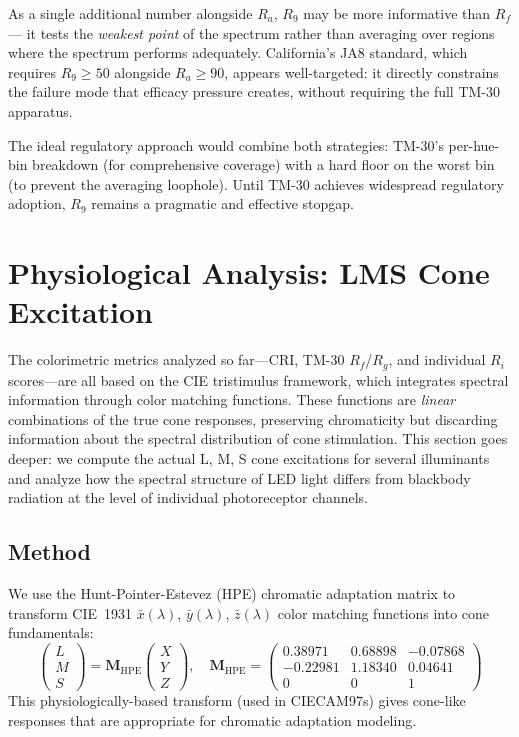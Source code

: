 \documentclass[11pt]{article}
\begin{document}
As a single additional number alongside $R_a$, $R_9$ may be
more informative than $R_f$ --- it tests the \emph{weakest point}
of the spectrum rather than averaging over regions where the spectrum
performs adequately.  California's JA8 standard, which requires
$R_9 \geq 50$ alongside $R_a \geq 90$, appears well-targeted:
it directly constrains the failure mode that efficacy pressure creates,
without requiring the full TM-30 apparatus.

The ideal regulatory approach would combine both strategies:
TM-30's per-hue-bin breakdown (for comprehensive coverage) with a
hard floor on the worst bin (to prevent the averaging loophole).
Until TM-30 achieves widespread regulatory adoption, $R_9$ remains
a pragmatic and effective stopgap.

\section{Physiological Analysis: LMS Cone Excitation}
\label{sec:lms}

The colorimetric metrics analyzed so far---CRI, TM-30 $R_f$/$R_g$, and
individual $R_i$ scores---are all based on the CIE tristimulus framework,
which integrates spectral information through color matching functions.
These functions are \emph{linear} combinations of the true cone responses,
preserving chromaticity but discarding information about the spectral
distribution of cone stimulation.  This section goes deeper: we compute
the actual L, M, S cone excitations for several illuminants and analyze
how the spectral structure of LED light differs from blackbody radiation
at the level of individual photoreceptor channels.

\subsection{Method}

We use the Hunt-Pointer-Estevez (HPE) chromatic adaptation matrix
to transform CIE~1931 $\bar{x}(\lambda)$, $\bar{y}(\lambda)$,
$\bar{z}(\lambda)$ color matching functions into cone fundamentals:
\[
\begin{pmatrix} L \\ M \\ S \end{pmatrix}
= \mathbf{M}_{\text{HPE}}
\begin{pmatrix} X \\ Y \\ Z \end{pmatrix},
\quad
\mathbf{M}_{\text{HPE}} =
\begin{pmatrix}
 0.38971 &  0.68898 & -0.07868 \\
-0.22981 &  1.18340 &  0.04641 \\
 0       &  0       &  1
\end{pmatrix}
\]
This physiologically-based transform (used in CIECAM97s) gives
cone-like responses that are appropriate for chromatic adaptation
modeling.
\end{document}
